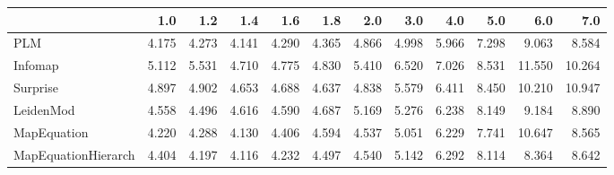 \begin{tabular}{lrrrrrrrrrrr}
\toprule
{} &   1.0 &   1.2 &   1.4 &   1.6 &   1.8 &   2.0 &   3.0 &   4.0 &   5.0 &    6.0 &    7.0 \\
\midrule
PLM                 & 4.175 & 4.273 & 4.141 & 4.290 & 4.365 & 4.866 & 4.998 & 5.966 & 7.298 &  9.063 &  8.584 \\
Infomap             & 5.112 & 5.531 & 4.710 & 4.775 & 4.830 & 5.410 & 6.520 & 7.026 & 8.531 & 11.550 & 10.264 \\
Surprise            & 4.897 & 4.902 & 4.653 & 4.688 & 4.637 & 4.838 & 5.579 & 6.411 & 8.450 & 10.210 & 10.947 \\
LeidenMod           & 4.558 & 4.496 & 4.616 & 4.590 & 4.687 & 5.169 & 5.276 & 6.238 & 8.149 &  9.184 &  8.890 \\
MapEquation         & 4.220 & 4.288 & 4.130 & 4.406 & 4.594 & 4.537 & 5.051 & 6.229 & 7.741 & 10.647 &  8.565 \\
MapEquationHierarch & 4.404 & 4.197 & 4.116 & 4.232 & 4.497 & 4.540 & 5.142 & 6.292 & 8.114 &  8.364 &  8.642 \\
\bottomrule
\end{tabular}
